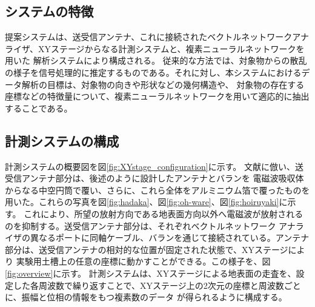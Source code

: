 \documentclass[11pt,a4paper,uplatex,draft]{ujarticle}
\begin{document}
  
  \subsection{システムの特徴}
    
    提案システムは、送受信アンテナ、これに接続されたベクトルネットワークアナライザ、XYステージからなる計測システムと、複素ニューラルネットワークを用いた
    解析システムにより構成される。
    従来的な方法では、対象物からの散乱の様子を信号処理的に推定するものである。それに対し、本システムにおけるデータ解析の目標は、対象物の向きや形状などの幾何構造や、
    対象物の存在する座標などの特徴量について、複素ニューラルネットワークを用いて適応的に抽出することである。

  \subsection{計測システムの構成}

    計測システムの概要図を図\ref{fig:XYstage_configuration}に示す。
    文献\cite{absorbing_material}に倣い、送受信アンテナ部分は、後述のように設計したアンテナとバランを
    電磁波吸収体からなる中空円筒で覆い、さらに、これら全体をアルミニウム箔で覆ったものを用いた。これらの写真を図\ref{fig:hadaka}、図\ref{fig:oh-ware}、図\ref{fig:hoiruyaki}に示す。
    これにより、所望の放射方向である地表面方向以外へ電磁波が放射されるのを抑制する。送受信アンテナ部分は、それぞれベクトルネットワーク
    アナライザの異なるポートに同軸ケーブル、バランを通じて接続されている。アンテナ部分は、送受信アンテナの相対的な位置が固定された状態で、XYステージにより
    実験用土槽上の任意の座標に動かすことができる。この様子を、図\ref{fig:overview}に示す。
    計測システムは、XYステージによる地表面の走査を、設定した各周波数で繰り返すことで、XYステージ上の2次元の座標と周波数ごとに、振幅と位相の情報をもつ複素数のデータ
    が得られるように構成する。
\end{document}
